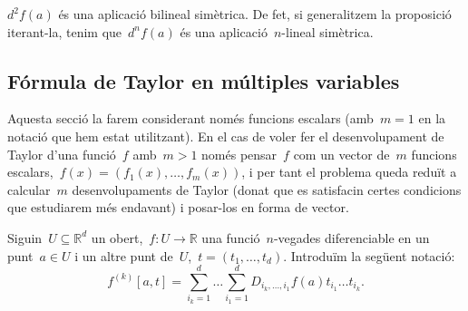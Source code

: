 \documentclass[../../main.tex]{subfiles}
\begin{document}
	\begin{corollary}\label{obs:diferencial bilineal}
		\(d^{2}f(a)\) és una aplicació bilineal simètrica.
		De fet, si generalitzem la proposició iterant-la, tenim que~\(d^{n}f(a)\) és una aplicació~\(n\)-lineal simètrica.
	\end{corollary}
	\subsection{Fórmula de Taylor en múltiples variables}
	Aquesta secció la farem considerant només funcions escalars (amb~\(m=1\) en la notació que hem estat utilitzant).
	En el cas de voler fer el desenvolupament de Taylor d'una funció~\(f\) amb~\(m>1\) només pensar~\(f\) com un vector de~\(m\) funcions escalars,~\(f(x)=(f_{1}(x),\dots,f_{m}(x))\), i per tant el problema queda reduït a calcular~\(m\) desenvolupaments de Taylor (donat que es satisfacin certes condicions que estudiarem més endavant) i posar-los en forma de vector.
	\begin{notation}
		Siguin~\(U\subseteq\mathbb{R}^{d}\) un obert,~\(f\colon U\to\mathbb{R}\) una funció~\(n\)-vegades diferenciable en un punt~\(a\in U\) i un altre punt de~\(U\),~\(t=(t_{1},\dots,t_{d})\).
		Introduïm la següent notació:
		\[
		    f^{(k)}[a,t]=\sum_{i_{k}=1}^{d}\dots\sum_{i_{1}=1}^{d}D_{i_{k},\dots,i_{1}}f(a)t_{i_{1}}\dots t_{i_{k}}.
		\]
	\end{notation}
\end{document}
